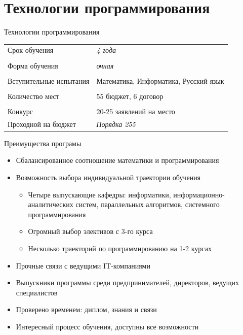 \documentclass{slides-style}
\begin{document}
    \begin{frame}[plain]
        \titlepage
    \end{frame}

    \section{Технологии программирования}

    \begin{frame}{Технологии программирования}
        \subtitle{Основная информация}
        \begin{center}
            \begin{tabular}{p{5cm} p{5cm}}
                Срок обучения           & \emph{4 года} \\
                \\
                Форма обучения          & \emph{очная} \\
                \\
                Вступительные испытания & Математика, \newline Информатика, \newline Русский язык \\
                \\
                Количество мест         & 55 бюджет, 6 договор\\
                \\
                Конкурс                 & 20-25 заявлений на место
                \\
                Проходной на бюджет     & \emph{Порядка 255}
            \end{tabular}
        \end{center}
    \end{frame}

    \begin{frame}{Преимущества програмы}
        \begin{itemize}
            \item Сбалансированное соотношение математики и программирования
            \item Возможность выбора индивидуальной траектории обучения
            \begin{itemize}
                \item Четыре выпускающие кафедры: информатики, информационно-аналитических систем, параллельных алгоритмов, системного программирования
                \item Огромный выбор элективов с 3-го курса
                \item Несколько траекторий по программированию на 1-2 курсах
            \end{itemize}
            \item Прочные связи с ведущими IT-компаниями
            \item Выпускники программы среди предпринимателей, директоров, ведущих специалистов
            \item Проверено временем: диплом, знания и связи
            \item Интересный процесс обучения, доступны все возможности
        \end{itemize}
    \end{frame}
\end{document}
